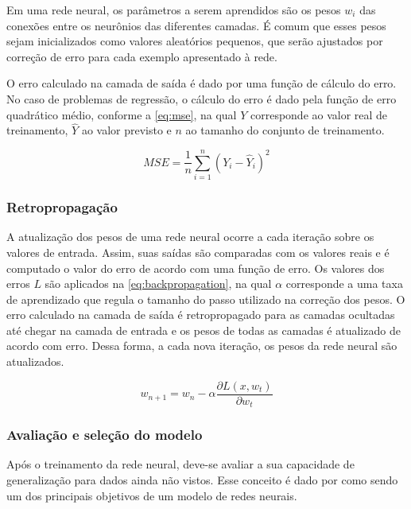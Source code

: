 \documentclass[
    12pt,
    oneside,
    a4paper,
    english,
    brazil
]{abntex2}
\begin{document}
Em uma  rede neural, os  parâmetros a serem aprendidos  são os pesos  $w_i$ das
conexões entre  os neurônios das  diferentes camadas.  É comum que  esses pesos
sejam inicializados como  valores aleatórios pequenos, que  serão ajustados por
correção de erro para cada exemplo apresentado à rede.

O erro calculado na  camada de saída é dado por uma função  de cálculo do erro.
No caso de problemas de regressão, o cálculo do erro é dado pela função de erro
quadrático médio, conforme a \autoref{eq:mse}, na qual $Y$ corresponde ao valor
real de treinamento,  $\hat{Y}$ ao valor previsto e $n$  ao tamanho do conjunto
de treinamento.

\begin{equation}\label{eq:mse}
    MSE = \frac{1}{n}\sum_{i=1}^{n}{{(Y_i - \hat{Y}_i)}^2}
\end{equation}

\subsubsection{Retropropagação}

A atualização  dos pesos  de uma rede  neural ocorre a  cada iteração  sobre os
valores de entrada. Assim, suas saídas são  comparadas com os valores reais e é
computado o  valor do erro  de acordo  com uma função  de erro. Os  valores dos
erros  $L$  são aplicados  na  \autoref{eq:backpropagation},  na qual  $\alpha$
corresponde a uma  taxa de aprendizado que regula o  tamanho do passo utilizado
na correção  dos pesos. O  erro calculado na  camada de saída  é retropropagado
para as camadas ocultadas  até chegar na camada de entrada e  os pesos de todas
as camadas é atualizado de acordo com  erro. Dessa forma, a cada nova iteração,
os pesos da rede neural são atualizados.

\begin{equation}\label{eq:backpropagation}
    w_{n+1} = w_n - \alpha \frac{\partial L(x,w_t)}{\partial w_t}
\end{equation}

\subsubsection{Avaliação e seleção do modelo}

Após  o  treinamento da  rede  neural,  deve-se  avaliar  a sua  capacidade  de
generalização  para  dados   ainda  não  vistos.  Esse  conceito   é  dado  por
 como sendo um dos  principais objetivos de um modelo de
redes neurais.
\end{document}
